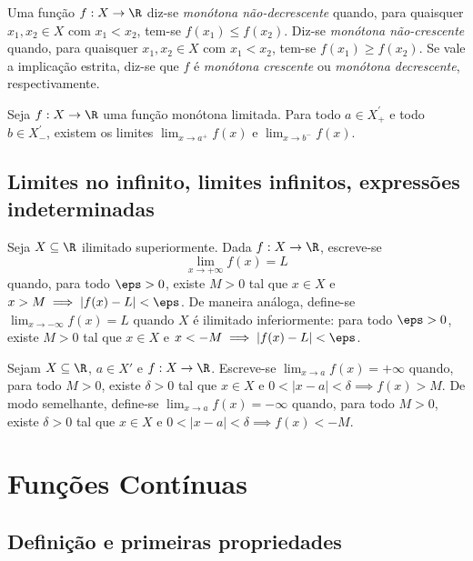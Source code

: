 \documentclass{article}
\begin{document}
\begin{defn}
    Uma função \(f: X \to \R\) diz-se \emph{monótona não-decrescente} quando, para quaisquer \(x_1, x_2 \in X\) com \(x_1 < x_2\), tem-se \(f(x_1) \leq f(x_2)\). Diz-se \emph{monótona não-crescente} quando, para quaisquer \(x_1, x_2 \in X\) com \(x_1 < x_2\), tem-se \(f(x_1) \geq f(x_2)\). Se vale a implicação estrita, diz-se que \(f\) é \emph{monótona crescente} ou \emph{monótona decrescente}, respectivamente.
\end{defn}

\begin{prop}
    Seja \(f: X \to \R\) uma função monótona limitada. Para todo \(a \in X_{+}^{'}\) e todo \(b \in X_{-}^{'}\), existem os limites \(\lim_{x \to a^{+}} f(x)\) e \(\lim_{x \to b^{-}} f(x)\).
\end{prop}

\subsection{Limites no infinito, limites infinitos, expressões indeterminadas}

\begin{defn} 
    Seja \(X \subseteq \R\) ilimitado superiormente. Dada \(f: X \to \R\), escreve-se
    \[
        \lim_{x \to +\infty} f(x) = L
    \]
    \noindent quando, para todo \(\eps > 0\), existe \(M > 0\) tal que \(x \in X\) e \(x > M \implies |f(x) - L| < \eps\). De maneira análoga, define-se \(\lim_{x \to -\infty} f(x) = L\) quando \(X\) é ilimitado inferiormente: para todo \(\eps > 0\), existe \(M > 0\) tal que \(x \in X\) e \(x < -M \implies |f(x) - L| < \eps\).
\end{defn}

\begin{defn} 
    Sejam \(X \subseteq \R\), \(a \in X'\) e \(f: X \to \R\). Escreve-se \(\lim_{x \to a} f(x) = +\infty\) quando, para todo \(M > 0\), existe \(\delta > 0\) tal que \(x \in X\) e \(0 < |x - a| < \delta \implies f(x) > M\). De modo semelhante, define-se \(\lim_{x \to a} f(x) = -\infty\) quando, para todo \(M > 0\), existe \(\delta > 0\) tal que \(x \in X\) e \(0 < |x - a| < \delta \implies f(x) < -M\).
\end{defn}

\section{Funções Contínuas}
\subsection{Definição e primeiras propriedades}
\end{document}
